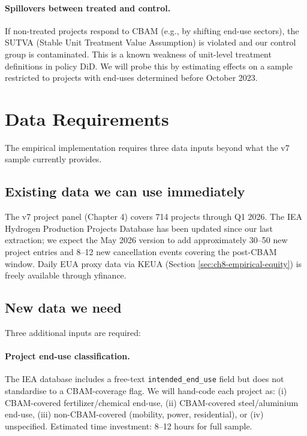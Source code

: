 \documentclass[11pt,a4paper]{article}
\begin{document}
\paragraph{Spillovers between treated and control.} If non-treated projects respond to CBAM (e.g., by shifting end-use sectors), the SUTVA (Stable Unit Treatment Value Assumption) is violated and our control group is contaminated. This is a known weakness of unit-level treatment definitions in policy DiD. We will probe this by estimating effects on a sample restricted to projects with end-uses determined before October 2023.

\section{Data Requirements}
\label{sec:ch8-data}

The empirical implementation requires three data inputs beyond what the v7 sample currently provides.

\subsection{Existing data we can use immediately}

The v7 project panel (Chapter 4) covers 714 projects through Q1 2026. The IEA Hydrogen Production Projects Database has been updated since our last extraction; we expect the May 2026 version to add approximately 30--50 new project entries and 8--12 new cancellation events covering the post-CBAM window. Daily EUA proxy data via KEUA (Section \ref{sec:ch8-empirical-equity}) is freely available through yfinance.

\subsection{New data we need}

Three additional inputs are required:

\paragraph{Project end-use classification.} The IEA database includes a free-text \texttt{intended\_end\_use} field but does not standardise to a CBAM-coverage flag. We will hand-code each project as: (i) CBAM-covered fertilizer/chemical end-use, (ii) CBAM-covered steel/aluminium end-use, (iii) non-CBAM-covered (mobility, power, residential), or (iv) unspecified. Estimated time investment: 8--12 hours for full sample.
\end{document}
